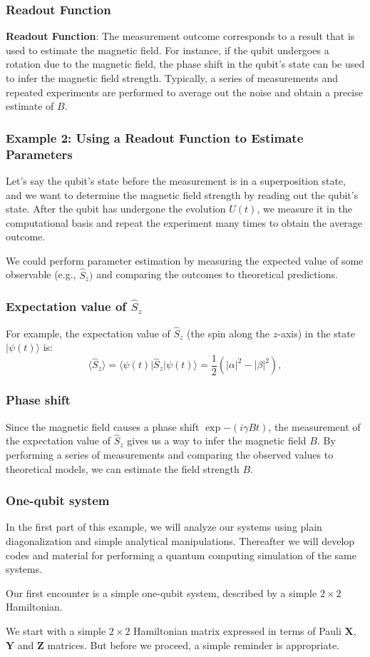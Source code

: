 \documentclass{beamer}
\begin{document}
\begin{frame}
\frametitle{Readout Function}

\textbf{Readout Function}: The measurement outcome corresponds to a result that
is used to estimate the magnetic field. For instance, if the qubit
undergoes a rotation due to the magnetic field, the phase shift in the
qubit’s state can be used to infer the magnetic field
strength. Typically, a series of measurements and repeated experiments
are performed to average out the noise and obtain a precise estimate
of $B$.
\end{frame}

\begin{frame}
\frametitle{Example 2: Using a Readout Function to Estimate Parameters}

Let’s say the qubit’s state before the measurement is in a
superposition state, and we want to determine the magnetic field
strength by reading out the qubit’s state. After the qubit has
undergone the evolution $U(t)$, we measure it in the computational basis
and repeat the experiment many times to obtain the average outcome.

We could perform parameter estimation by measuring the expected value
of some observable (e.g., $\hat{S}_z)$ and comparing the outcomes to
theoretical predictions.
\end{frame}

\begin{frame}
\frametitle{Expectation value of $\hat{S}_z$}

For example, the expectation value of $\hat{S}_z$ (the spin along the $z$-axis)
in the state $\vert \psi(t) \rangle$ is:
\[
\langle \hat{S}_z \rangle = \langle \psi(t) \vert \hat{S}_z \vert \psi(t) \rangle = \frac{1}{2} \left( |\alpha|^2 - |\beta|^2 \right),
\]
\end{frame}

\begin{frame}
\frametitle{Phase shift}

Since the magnetic field causes a phase shift $\exp{-(i \gamma B t)}$, the
measurement of the expectation value of $\hat{S}_z$ gives us a way to
infer the magnetic field $B$. By performing a series of measurements and
comparing the observed values to theoretical models, we can estimate
the field strength $B$.
\end{frame}

\begin{frame}
\frametitle{One-qubit system}

In the first part of this example, we will analyze our systems using
plain diagonalization and simple analytical manipulations.  Thereafter
we will develop codes and material for performing a quantum computing
simulation of the same systems.

Our first encounter is a simple one-qubit system, described by a simple $2\times 2$ Hamiltonian.

We start with a simple $2\times 2$ Hamiltonian matrix expressed in
terms of Pauli $\bm{X}$, $\bm{Y}$  and $\bm{Z}$ matrices. But before we proceed, a simple reminder is appropriate.
\end{frame}
\end{document}
